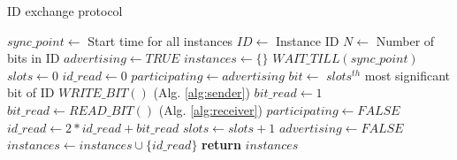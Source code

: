 \begin{algorithm}[!t]
\caption{ID exchange protocol }
\label{alg:protcol}
\begin{algorithmic}[1]
\STATE $sync\_point \leftarrow$ {Start time for all instances}
\STATE $ID \leftarrow$ {Instance ID}
\STATE $N \leftarrow$ {Number of bits in ID}
\STATE $advertising \leftarrow TRUE$
\STATE $instances \leftarrow \{\} $
\STATE $WAIT\_TILL(sync\_point)$
    \STATE $slots \leftarrow 0$
    \STATE $id\_read \leftarrow 0$
    \STATE $participating \leftarrow advertising$
        \STATE $bit \leftarrow$ {$slots^{th}$ most significant bit of ID}
            \STATE $WRITE\_BIT()$               (Alg. \ref{alg:sender})
            \STATE $bit\_read \leftarrow 1$
        \ELSE
            \STATE $bit\_read \leftarrow READ\_BIT()$       (Alg. \ref{alg:receiver})
                \STATE $participating \leftarrow FALSE$
            \ENDIF
        \ENDIF
        \STATE $id\_read \leftarrow 2 * id\_read + bit\_read$
        \STATE $slots \leftarrow slots + 1$
    \ENDWHILE
        \STATE $advertising \leftarrow FALSE$
    \ENDIF
    \STATE $instances \leftarrow instances \cup \{id\_read\}$
\ENDWHILE
\STATE \textbf{return} $instances$
\end{algorithmic}
\end{algorithm}

